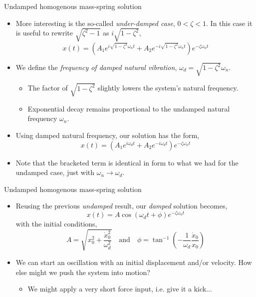 \documentclass[11pt,aspectratio=169,handout]{beamer}
\begin{document}
\begin{frame}[c]{Undamped homogenous mass-spring solution}
	\begin{itemize}
		\item<1-> More interesting is the so-called \textit{under-damped case}, $0<\zeta<1$. In this case it is useful to rewrite $ \sqrt{\zeta^2-1}$ as $i \sqrt{1-\zeta^2}$, 
		\begin{equation}
			x(t) = \left(A_1e^{ i \sqrt{1-\zeta^2}\omega_n t} + A_2 e^{-i \sqrt{1-\zeta^2}\omega_n t}\right)e^{-\zeta\omega_n t}
		\end{equation}
		\item<2-> We define the \textit{frequency of damped natural vibration}, $ \omega_d = \sqrt{1-\zeta^2}\omega_n $. 
		\begin{itemize}
			\item[-] The factor of  $\sqrt{1-\zeta^2}$ slightly lowers the system's natural frequency. 
			\item[-] Exponential decay remains proportional to the undamped natural frequency $\omega_n$.
		\end{itemize}
		\item<3-> Using damped natural frequency, our solution has the form,
				\begin{equation}
			x(t) = \left(A_1e^{ i\omega_d t} + A_2 e^{-i \omega_d t}\right)e^{-\zeta\omega_n t}
		\end{equation}
		\item<3-> Note that the bracketed term is identical in form to what we had for the undamped case, just with $\omega_n\rightarrow\omega_d$.
	\end{itemize}
\end{frame}

\begin{frame}[c]{Undamped homogenous mass-spring solution}
	\begin{itemize}
		\item<1-> Reusing the previous \textit{undamped} result, our \textit{damped} solution becomes, 
			\begin{equation}
				x(t) = A\cos(\omega_d t + \phi) e^{-\zeta\omega_n t} 
			\end{equation}
		with the initial conditions, 
		\begin{equation}
			A = \sqrt{x_0^2 + \frac{\dot{x}_0^2}{\omega_d^2}}\quad \mbox{and} \quad \phi = \tan^{-1}\left(-\frac{1}{\omega_d}\frac{\dot{x}_0}{x_0}\right)
		\end{equation}
		\item<2-> We can start an oscillation with an initial displacement and/or velocity. How else might we push the system into motion?
		\begin{itemize}
			\item[-] We might apply a very short force input, i.e. give it a kick...
		\end{itemize}
	\end{itemize}
\end{frame}
\end{document}
